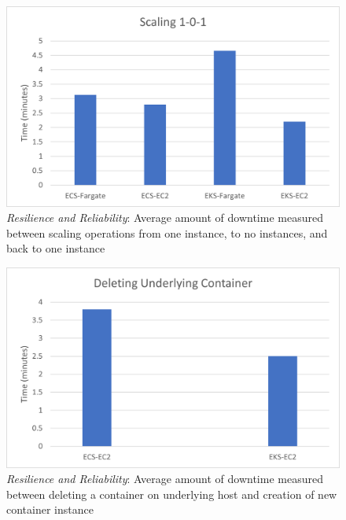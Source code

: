 \begin{figure}[hp]
  \includegraphics{images/rr-scaling.png}
  \caption{\emph{Resilience and Reliability}: Average amount of downtime measured between scaling operations from one instance, to no instances, and back to one instance}
  \label{fig:rr_scaling}
\end{figure}

\begin{figure}[hp]
  \includegraphics{images/rr-deleteContainer.png}
  \caption{\emph{Resilience and Reliability}: Average amount of downtime measured between deleting a container on underlying host and creation of new container instance}
  \label{fig:rr_deleteContainer}
\end{figure}

